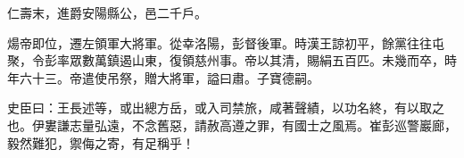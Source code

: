 \begin{pinyinscope}
 仁壽末，進爵安陽縣公，邑二千戶。



 煬帝即位，遷左領軍大將軍。從幸洛陽，彭督後軍。時漢王諒初平，餘黨往往屯聚，令彭率眾數萬鎮遏山東，復領慈州事。帝以其清，賜絹五百匹。未幾而卒，時年六十三。帝遣使吊祭，贈大將軍，謚曰肅。子寶德嗣。



 史臣曰：王長述等，或出總方岳，或入司禁旅，咸著聲績，以功名終，有以取之也。伊婁謙志量弘遠，不念舊惡，請赦高遵之罪，有國士之風焉。崔彭巡警巖廊，毅然難犯，禦侮之寄，有足稱乎！



\end{pinyinscope}